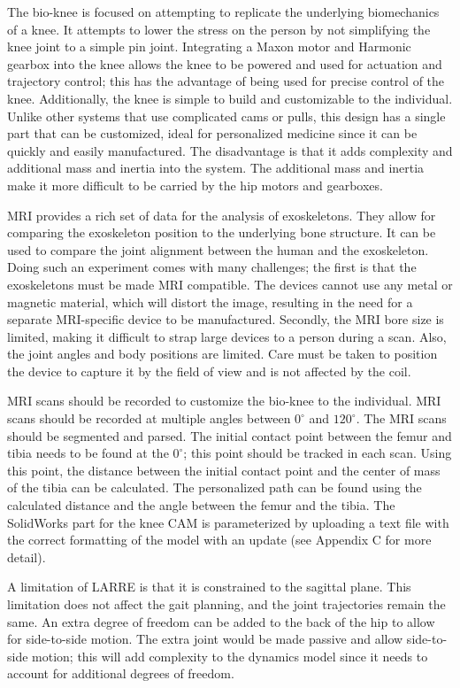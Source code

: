 The bio-knee is focused on attempting to replicate the underlying biomechanics of a knee. It attempts to lower the stress on the person by not simplifying the knee joint to a simple pin joint. Integrating a Maxon motor and Harmonic gearbox into the knee allows the knee to be powered and used for actuation and trajectory control; this has the advantage of being used for precise control of the knee. Additionally, the knee is simple to build and customizable to the individual. Unlike other systems that use complicated cams or pulls, this design has a single part that can be customized, ideal for personalized medicine since it can be quickly and easily manufactured. The disadvantage is that it adds complexity and additional mass and inertia into the system. The additional mass and inertia make it more difficult to be carried by the hip motors and gearboxes.

MRI provides a rich set of data for the analysis of exoskeletons. They allow for comparing the exoskeleton position to the underlying bone structure. It can be used to compare the joint alignment between the human and the exoskeleton. Doing such an experiment comes with many challenges; the first is that the exoskeletons must be made MRI compatible. The devices cannot use any metal or magnetic material, which will distort the image, resulting in the need for a separate MRI-specific device to be manufactured. Secondly, the MRI bore size is limited, making it difficult to strap large devices to a person during a scan. Also, the joint angles and body positions are limited. Care must be taken to position the device to capture it by the field of view and is not affected by the coil. 

MRI scans should be recorded to customize the bio-knee to the individual. MRI scans should be recorded at multiple angles between $0^{\circ}$ and $120^{\circ}$. The MRI scans should be segmented and parsed. The initial contact point between the femur and tibia needs to be found at the $0^{\circ}$; this point should be tracked in each scan. Using this point, the distance between the initial contact point and the center of mass of the tibia can be calculated. The personalized path can be found using the calculated distance and the angle between the femur and the tibia. The SolidWorks part for the knee CAM is parameterized by uploading a text file with the correct formatting of the model with an update (see Appendix C for more detail). 

A limitation of LARRE is that it is constrained to the sagittal plane. This limitation does not affect the gait planning, and the joint trajectories remain the same. An extra degree of freedom can be added to the back of the hip to allow for side-to-side motion. The extra joint would be made passive and allow side-to-side motion; this will add complexity to the dynamics model since it needs to account for additional degrees of freedom.  

